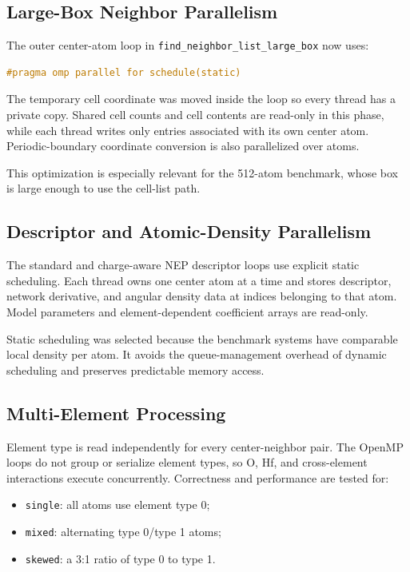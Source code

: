 \documentclass[11pt]{article}
\begin{document}
\subsection{Large-Box Neighbor Parallelism}
The outer center-atom loop in \texttt{find\_neighbor\_list\_large\_box} now uses:
\begin{lstlisting}[language=C++]
#pragma omp parallel for schedule(static)
\end{lstlisting}
The temporary cell coordinate was moved inside the loop so every thread has a
private copy. Shared cell counts and cell contents are read-only in this phase,
while each thread writes only entries associated with its own center atom.
Periodic-boundary coordinate conversion is also parallelized over atoms.

This optimization is especially relevant for the 512-atom benchmark, whose
box is large enough to use the cell-list path.

\subsection{Descriptor and Atomic-Density Parallelism}
The standard and charge-aware NEP descriptor loops use explicit static
scheduling. Each thread owns one center atom at a time and stores descriptor,
network derivative, and angular density data at indices belonging to that atom.
Model parameters and element-dependent coefficient arrays are read-only.

Static scheduling was selected because the benchmark systems have comparable
local density per atom. It avoids the queue-management overhead of dynamic
scheduling and preserves predictable memory access.

\subsection{Multi-Element Processing}
Element type is read independently for every center-neighbor pair. The OpenMP
loops do not group or serialize element types, so O, Hf, and cross-element
interactions execute concurrently. Correctness and performance are tested for:
\begin{itemize}
  \item \texttt{single}: all atoms use element type 0;
  \item \texttt{mixed}: alternating type 0/type 1 atoms;
  \item \texttt{skewed}: a 3:1 ratio of type 0 to type 1.
\end{itemize}
\end{document}
